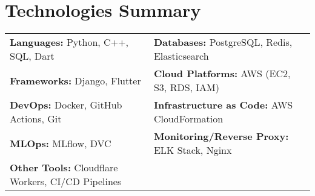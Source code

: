 \documentclass[letterpaper,11pt]{article}
\begin{document}
\section{Technologies Summary}
  \begin{tabularx}{\textwidth}{X X}
    \textbf{Languages:} Python, C++, SQL, Dart & \textbf{Databases:} PostgreSQL, Redis, Elasticsearch \\
    \textbf{Frameworks:} Django, Flutter & \textbf{Cloud Platforms:} AWS (EC2, S3, RDS, IAM) \\
    \textbf{DevOps:} Docker, GitHub Actions, Git & \textbf{Infrastructure as Code:} AWS CloudFormation \\
    \textbf{MLOps:} MLflow, DVC & \textbf{Monitoring/Reverse Proxy:} ELK Stack, Nginx \\
    \textbf{Other Tools:} Cloudflare Workers, CI/CD Pipelines & \\
  \end{tabularx}

\end{document}
